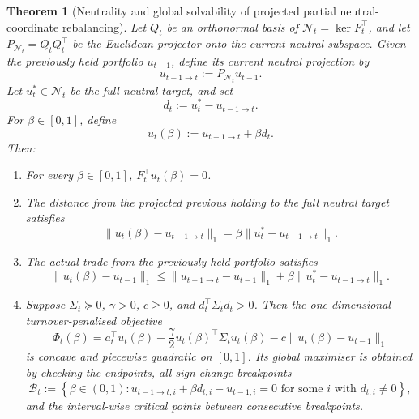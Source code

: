 \documentclass[11pt]{article}
\newtheorem{theorem}{Theorem}
\newcommand{\N}{\mathcal{N}}
\begin{document}
\begin{theorem}[Neutrality and global solvability of projected partial neutral-coordinate rebalancing]
\label{thm:neutral-partial-rebalancing}
Let $Q_t$ be an orthonormal basis of $\N_t=\ker F_t^\top$, and let
$P_{\N_t}=Q_tQ_t^\top$ be the Euclidean projector onto the current neutral subspace.  Given the
previously held portfolio $u_{t-1}$, define its current neutral projection by
\[
        u_{t-1\to t}:=P_{\N_t}u_{t-1}.
\]
Let $u_t^\ast\in\N_t$ be the full neutral target, and set
\[
        d_t:=u_t^\ast-u_{t-1\to t}.
\]
For $\beta\in[0,1]$, define
\[
        u_t(\beta):=u_{t-1\to t}+\beta d_t.
\]
Then:
\begin{enumerate}[leftmargin=1.5em]
\item For every $\beta\in[0,1]$, $F_t^\top u_t(\beta)=0$.
\item The distance from the projected previous holding to the full neutral target satisfies
\begin{equation}
        \|u_t(\beta)-u_{t-1\to t}\|_1=\beta\|u_t^\ast-u_{t-1\to t}\|_1.
\end{equation}
\item The actual trade from the previously held portfolio satisfies
\begin{equation}
        \|u_t(\beta)-u_{t-1}\|_1
        \le \|u_{t-1\to t}-u_{t-1}\|_1+\beta\|u_t^\ast-u_{t-1\to t}\|_1.
\end{equation}
\item Suppose $\Sigma_t\succeq0$, $\gamma>0$, $c\ge0$, and $d_t^\top\Sigma_t d_t>0$.  Then the
one-dimensional turnover-penalised objective
\begin{equation}
        \Phi_t(\beta)
        =a_t^\top u_t(\beta)-\frac{\gamma}{2}u_t(\beta)^\top\Sigma_tu_t(\beta)
        -c\|u_t(\beta)-u_{t-1}\|_1
\end{equation}
is concave and piecewise quadratic on $[0,1]$.  Its global maximiser is obtained by checking the
endpoints, all sign-change breakpoints
\[
        \mathcal B_t
        :=
        \left\{
        \beta\in(0,1):
        u_{t-1\to t,i}+\beta d_{t,i}-u_{t-1,i}=0
        \text{ for some }i\text{ with }d_{t,i}\ne0
        \right\},
\]
and the interval-wise critical points between consecutive breakpoints.
\end{enumerate}
\end{theorem}
\end{document}

